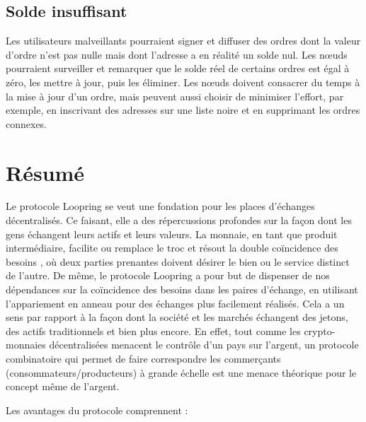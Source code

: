 \documentclass[UTF8,nofonts]{article}
\begin{document}
\begin{multicols}{2}
\subsection{Solde insuffisant}
Les utilisateurs malveillants pourraient signer et diffuser des ordres dont la valeur d’ordre n'est pas nulle mais dont l'adresse a en réalité un solde nul. Les nœuds pourraient surveiller et remarquer que le solde réel de certains ordres est égal à zéro, les mettre à jour, puis les éliminer.
Les nœuds doivent consacrer du temps à la mise à jour d’un ordre, mais peuvent aussi choisir de minimiser l'effort, par exemple, en inscrivant des adresses sur une liste noire et en supprimant les ordres connexes.


\section{Résumé}

Le protocole Loopring se veut une fondation pour les places d’échanges décentralisés. Ce faisant, elle a des répercussions profondes sur la façon dont les gens échangent leurs actifs et leurs valeurs. La monnaie, en tant que produit intermédiaire, facilite ou remplace le troc et résout la double coïncidence des besoins \cite{unenumerated2006}, où deux parties prenantes doivent désirer le bien ou le service distinct de l'autre. De même, le protocole Loopring a pour but de dispenser de nos dépendances sur la coïncidence des besoins dans les paires d’échange, en utilisant l'appariement en anneau pour des échanges plus facilement réalisés. Cela a un sens par rapport à la façon dont la société et les marchés échangent des jetons, des actifs traditionnels et bien plus encore. En effet, tout comme les crypto-monnaies décentralisées menacent le contrôle d'un pays sur l'argent, un protocole combinatoire qui permet de faire correspondre les commerçants (consommateurs/producteurs) à grande échelle est une menace théorique pour le concept même de l'argent.

Les avantages du protocole comprennent :


\end{multicols}
\end{document}

